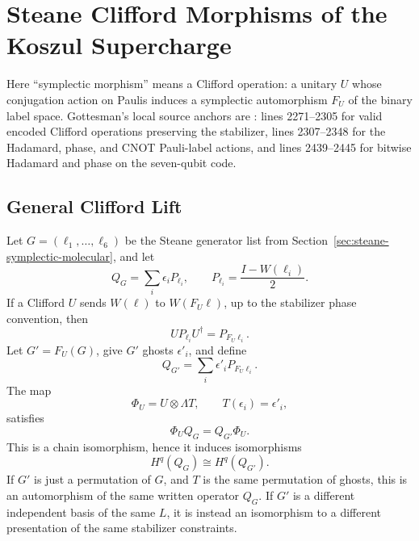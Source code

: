 
\section{Steane Clifford Morphisms of the Koszul Supercharge}
\label{sec:steane-clifford-koszul-morphisms}

Here ``symplectic morphism'' means a Clifford operation: a unitary \(U\) whose
conjugation action on Paulis induces a symplectic automorphism \(F_U\) of the
binary label space. Gottesman's local source anchors are :
lines 2271--2305 for valid encoded Clifford operations preserving the
stabilizer, lines 2307--2348 for the Hadamard, phase, and CNOT Pauli-label
actions, and lines 2439--2445 for bitwise Hadamard and phase on the
seven-qubit code.

\subsection{General Clifford Lift}

Let \(G=(\ell_1,\ldots,\ell_6)\) be the Steane generator list from
Section~\ref{sec:steane-symplectic-molecular}, and let
\[
  Q_G=\sum_i\epsilon_iP_{\ell_i},
  \qquad
  P_{\ell_i}=\frac{I-W(\ell_i)}2 .
\]
If a Clifford \(U\) sends \(W(\ell)\) to \(W(F_U\ell)\), up to the stabilizer
phase convention, then
\[
  U P_{\ell_i} U^\dagger=P_{F_U\ell_i}.
\]
Let \(G'=F_U(G)\), give \(G'\) ghosts \(\epsilon'_i\), and define
\[
  Q_{G'}=\sum_i\epsilon'_iP_{F_U\ell_i}.
\]
The map
\[
  \Phi_U=U\otimes\Lambda T,\qquad T(\epsilon_i)=\epsilon'_i,
\]
satisfies
\[
  \Phi_U Q_G=Q_{G'}\Phi_U.
\]
This is a chain isomorphism, hence it induces isomorphisms
\[
  H^q(Q_G)\cong H^q(Q_{G'}).
\]
If \(G'\) is just a permutation of \(G\), and \(T\) is the same permutation of
ghosts, this is an automorphism of the same written operator \(Q_G\). If \(G'\)
is a different independent basis of the same \(L\), it is instead an
isomorphism to a different presentation of the same stabilizer constraints.

